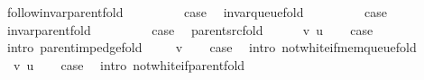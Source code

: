 \begin{isabellebody}
\ follow{\isacharunderscore}{\kern0pt}invar{\isacharunderscore}{\kern0pt}parent{\isacharunderscore}{\kern0pt}fold\ \isacommand{{\isachardot}{\kern0pt}}\isamarkupfalse%
\isanewline
{}\isamarkupfalse%
\isanewline
\ \ \isamarkupfalse%
\ {}\isanewline
\ \ \isamarkupfalse%
\ {\isacharquery}{\kern0pt}case\ \isamarkupfalse%
\ invar{\isacharunderscore}{\kern0pt}queue{\isacharunderscore}{\kern0pt}fold\ \isacommand{{\isachardot}{\kern0pt}}\isamarkupfalse%
\isanewline
{}\isamarkupfalse%
\isanewline
\ \ \isamarkupfalse%
\ {}\isanewline
\ \ \isamarkupfalse%
\ {\isacharquery}{\kern0pt}case\ \isamarkupfalse%
\ invar{\isacharunderscore}{\kern0pt}parent{\isacharunderscore}{\kern0pt}fold\ \isacommand{{\isachardot}{\kern0pt}}\isamarkupfalse%
\isanewline
{}\isamarkupfalse%
\isanewline
\ \ \isamarkupfalse%
\ {}\isanewline
\ \ \isamarkupfalse%
\ {\isacharquery}{\kern0pt}case\ \isamarkupfalse%
\ parent{\isacharunderscore}{\kern0pt}src{\isacharunderscore}{\kern0pt}fold\ \isacommand{{\isachardot}{\kern0pt}}\isamarkupfalse%
\isanewline
{}\isamarkupfalse%
\isanewline
\ \ \isamarkupfalse%
\ {\isacharparenleft}{\kern0pt}{}\ v\ u{\isacharparenright}{\kern0pt}\isanewline
\ \ \isamarkupfalse%
\ {\isacharquery}{\kern0pt}case\ \isamarkupfalse%
\ {\isacharparenleft}{\kern0pt}intro\ parent{\isacharunderscore}{\kern0pt}imp{\isacharunderscore}{\kern0pt}edge{\isacharunderscore}{\kern0pt}fold{\isacharparenright}{\kern0pt}\isanewline
{}\isamarkupfalse%
\isanewline
\ \ \isamarkupfalse%
\ {\isacharparenleft}{\kern0pt}{}\ v{\isacharparenright}{\kern0pt}\isanewline
\ \ \isamarkupfalse%
\ {\isacharquery}{\kern0pt}case\ \isamarkupfalse%
\ {\isacharparenleft}{\kern0pt}intro\ not{\isacharunderscore}{\kern0pt}white{\isacharunderscore}{\kern0pt}if{\isacharunderscore}{\kern0pt}mem{\isacharunderscore}{\kern0pt}queue{\isacharunderscore}{\kern0pt}fold{\isacharparenright}{\kern0pt}\isanewline
{}\isamarkupfalse%
\isanewline
\ \ \isamarkupfalse%
\ {\isacharparenleft}{\kern0pt}{}\ v\ u{\isacharparenright}{\kern0pt}\isanewline
\ \ \isamarkupfalse%
\ {\isacharquery}{\kern0pt}case\ \isamarkupfalse%
\ {\isacharparenleft}{\kern0pt}intro\ not{\isacharunderscore}{\kern0pt}white{\isacharunderscore}{\kern0pt}if{\isacharunderscore}{\kern0pt}parent{\isacharunderscore}{\kern0pt}fold{\isacharparenright}{\kern0pt}\isanewline

\end{isabellebody}
